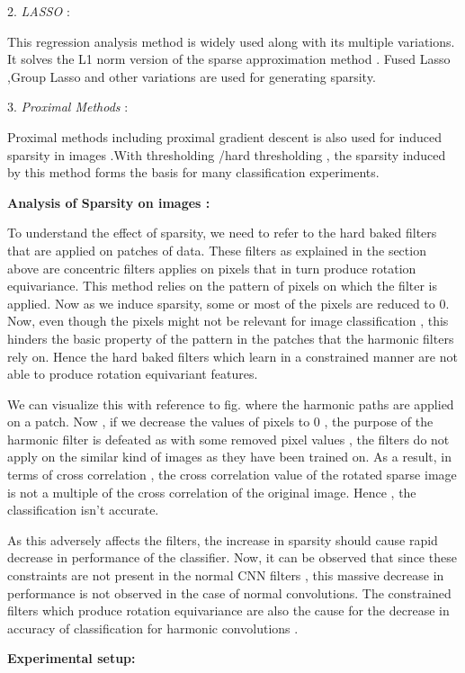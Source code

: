 \documentclass{article}
\begin{document}
2.	\emph{ LASSO }:

This regression analysis method is widely used along with its multiple variations. It solves the L1 norm version of the sparse approximation method . Fused Lasso ,Group Lasso and other variations are used for generating sparsity.

3.	\emph{Proximal Methods} :

Proximal methods including proximal gradient descent is also used for induced sparsity in images .With thresholding /hard thresholding , the sparsity induced by this method forms the basis for many classification experiments.

\textbf{Analysis of Sparsity on images :}

To understand the effect of sparsity, we need to refer to the hard baked filters that are applied on patches of data. These filters as explained in the section above are concentric filters applies on pixels that in turn produce rotation equivariance. This method relies on the pattern of pixels on which the filter is applied. Now as we induce sparsity, some or most of the pixels are reduced to 0. Now, even though the pixels might not be relevant for image classification , this hinders the basic property of the pattern in the patches that the harmonic filters rely on. Hence the hard baked filters which learn in a constrained manner are not able to produce rotation equivariant features. 

We can visualize this with reference to fig.  where the harmonic paths are applied on a patch. Now , if we decrease the values of pixels to 0 , the purpose of the harmonic filter is defeated as with some removed pixel values , the filters do not apply on the similar kind of images as they have been trained on. As a result, in terms of cross correlation , the cross correlation value of the rotated sparse image is not a multiple of the cross correlation of the original image. Hence , the classification isn’t accurate. 

As this adversely affects the filters, the increase in sparsity should cause rapid decrease in performance of the classifier. Now, it can be observed that since these constraints are not present in the normal CNN filters , this massive decrease in performance is not observed in the case of normal convolutions. The constrained filters which produce rotation equivariance are also the cause for the decrease in accuracy of classification for harmonic convolutions .

\textbf{Experimental setup:}
 
\end{document}
